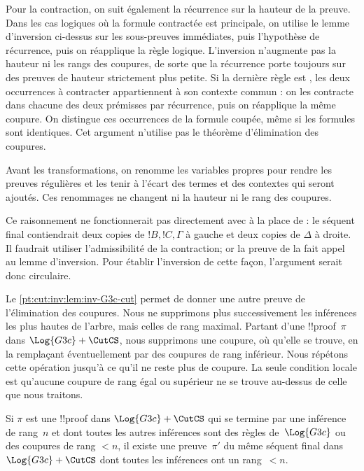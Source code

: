\documentclass[../../../include/open-logic-section]{subfiles}
\begin{document}
Pour la contraction, on suit également la récurrence sur la hauteur
de la preuve. Dans les cas logiques où la formule contractée est
principale, on utilise le lemme d'inversion ci-dessus sur les
sous-preuves immédiates, puis l'hypothèse de récurrence, puis on
réapplique la règle logique. L'inversion n'augmente pas la hauteur
ni les rangs des coupures, de sorte que la récurrence porte toujours
sur des preuves de hauteur strictement plus petite. Si la dernière
règle est \CutCS, les deux occurrences à contracter appartiennent
à son contexte commun : on les contracte dans chacune des deux
prémisses par récurrence, puis on réapplique la même coupure.
On distingue ces occurrences de la formule coupée, même si les
formules sont identiques. Cet argument n'utilise pas le théorème
d'élimination des coupures.

Avant les transformations, on renomme les variables propres pour
rendre les preuves régulières et les tenir à l'écart des termes et
des contextes qui seront ajoutés. Ces renommages ne changent ni la
hauteur ni le rang des coupures.

Ce raisonnement ne fonctionnerait pas directement avec \Cut
à la place de \CutCS : le séquent final contiendrait deux copies
de $!B,!C,\Gamma$ à gauche et deux copies de $\Delta$ à droite.
Il faudrait utiliser l'admissibilité de la contraction; or la
preuve de la  fait appel au lemme
d'inversion. Pour établir l'inversion de cette façon, l'argument
serait donc circulaire.

Le \cref{pt:cut:inv:lem:inv-G3c-cut} permet de donner une autre preuve
de l'élimination des coupures. Nous ne supprimons plus successivement
les inférences \CutCS les plus hautes de l'arbre, mais celles
de rang maximal. Partant d'une !!{proof}~$\pi$ dans
$\Log{G3c}+\CutCS$, nous supprimons une coupure, où qu'elle
se trouve, en la remplaçant éventuellement par des coupures
de rang inférieur. Nous répétons cette opération jusqu'à
ce qu'il ne reste plus de coupure. La seule condition locale
est qu'aucune coupure de rang égal ou supérieur ne se trouve
au-dessus de celle que nous traitons.

\begin{lem}
Si $\pi$ est une !!{proof} dans $\Log{G3c}+\CutCS$
qui se termine par une inférence \CutCS de rang~$n$ et dont
toutes les autres inférences sont des règles de~$\Log{G3c}$
ou des coupures \CutCS de rang $<n$, il existe une preuve~$\pi'$
du même séquent final dans~$\Log{G3c}+\CutCS$ dont toutes
les inférences \CutCS ont un rang~$<n$.
\end{lem}
\end{document}
